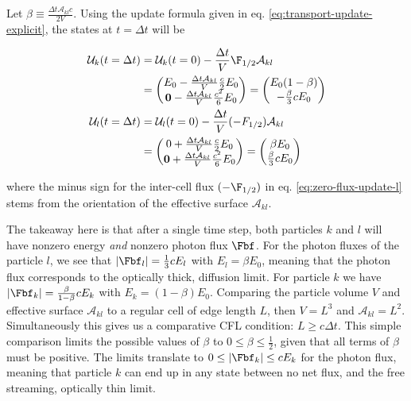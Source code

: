 Let $\beta \equiv \frac{\Delta t \mathcal{A}_{kl} c}{2 V}$. Using the update formula given in eq.
\ref{eq:transport-update-explicit}, the states at $t = \Delta t$ will be

\begin{align}
	\mathcal{U}_k(t = \Delta t) &= \mathcal{U}_k (t = 0) - \frac{\Delta t}{V} \F_{1/2}
\mathcal{A}_{kl} \\
	&=	\left(\begin{matrix}
        E_0 -  \frac{\Delta t \mathcal{A}_{kl}}{V} \frac{c}{2} E_0 \\
        \mathbf{0} - \frac{\Delta t \mathcal{A}_{kl}}{V} \frac{c^2}{6} E_0
	  	\end{matrix} \right)
    = \left( \begin{matrix}
             E_0 (1 - \beta) \\
             -\frac{\beta}{3} c E_0
             \end{matrix} \right) \\
%
	\mathcal{U}_l(t = \Delta t) &= \mathcal{U}_l (t = 0) - \frac{\Delta t}{V} (-F_{1/2})
\mathcal{A}_{kl} \label{eq:zero-flux-update-l}\\
	&=	\left(\begin{matrix}
        0 +  \frac{\Delta t \mathcal{A}_{kl}}{V} \frac{c}{2} E_0 \\
        \mathbf{0} + \frac{\Delta t \mathcal{A}_{kl}}{V} \frac{c^2}{6} E_0
	  	\end{matrix} \right)
    = \left( \begin{matrix}
             \beta E_0 \\
             \frac{\beta}{3} c E_0
             \end{matrix} \right)
\end{align}

where the minus sign for the inter-cell flux $(-\F_{1/2})$ in eq. \ref{eq:zero-flux-update-l} stems
from the orientation of the effective surface $\mathcal{A}_{kl}$.


The takeaway here is that after a single time step, both particles $k$ and $l$ will have nonzero
energy \emph{and} nonzero photon flux $\Fbf$. For the photon fluxes of the particle $l$, we see that
$|\Fbf_l| = \frac{1}{3} c E_l$ with $E_l = \beta E_0$, meaning that the photon flux corresponds to
the optically thick, diffusion limit. For particle $k$ we have $|\Fbf_k| = \frac{\beta}{1 - \beta} c
E_k$ with $E_k = (1 - \beta) E_0$. Comparing the particle volume $V$ and effective surface
$\mathcal{A}_{kl}$ to a regular cell of edge length $L$, then $V = L^3$ and $\mathcal{A}_{kl} =
L^2$. Simultaneously this gives us a comparative CFL condition: $L \geq c \Delta t$. This simple
comparison limits the possible values of $\beta$ to $0 \leq \beta \leq \frac{1}{2}$, given that all
terms of $\beta$ must be positive. The limits translate to $0 \leq |\Fbf_k| \leq c E_k$ for the
photon flux, meaning that particle $k$ can end up in any state between no net flux, and the free
streaming, optically thin limit.


